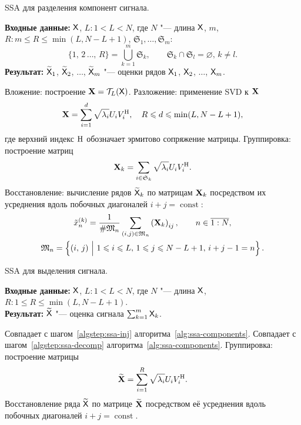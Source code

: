 \documentclass[specialist,
  substylefile=spbu_report.rtx,
subf,href,colorlinks=true, 12pt]{disser}
\theoremstyle{plain}
\theoremstyle{definition}
\theoremstyle{remark}
\newcommand{\Input}{\textbf{Входные данные: }}
\newcommand{\Output}{\textbf{Результат: }}
\begin{document}
\begin{algorithm}[!ht]
  \caption{SSA для разделения компонент сигнала.}
  \label{alg:ssa-components}
  \Input $\mathsf{X}$, $L: 1 < L < N$, где $N$ "--- длина $\mathsf{X}$, $m$, $R: m
  \leqslant R\leqslant \min(L, N-L+1)$,
  $\mathfrak{S}_1, \ldots, \mathfrak{S}_m$:
  \[
    \{1,\, 2\,\ldots,\, R\}=\bigcup_{k=1}^{m}\mathfrak{S}_k, \qquad
    \mathfrak{S}_k\cap \mathfrak{S}_l =\varnothing,\,
    k\ne l.
  \]
  \Output $\widetilde{\mathsf{X}}_1$, $\widetilde{\mathsf{X}}_2$, $\ldots$,
  $\widetilde{\mathsf{X}}_m$ "--- оценки рядов
  $\mathsf{X}_1$, $\mathsf{X}_2$, $\ldots$, $\mathsf{X}_m$.
  \begin{algorithmic}[1]
    \State Вложение: построение $\mathbf{X}=\mathcal{T}_L(\mathsf{X})$. \label{algstep:ssa-inj}
    \State Разложение: применение SVD к $\mathbf{X}$ \label{algstep:ssa-decomp}
    \begin{equation*}
      \mathbf{X}=\sum_{i=1}^{d} \sqrt{\lambda_i} U_i V_i^{\mathrm{H}}, \quad R
      \leqslant d \leqslant \min(L, N-L+1),
    \end{equation*}
    где верхний индекс $\mathrm{H}$ обозначает эрмитово сопряжение матрицы.
    \State Группировка: построение матриц
    \begin{equation*}
      \mathbf{X}_k=\sum_{i \in \mathfrak{S}_k} \sqrt{\lambda_i} U_i V_i^{\mathrm{H}}.
    \end{equation*}
    \State Восстановление: вычисление рядов $\widetilde{\mathsf{X}}_k$ по
    матрицам $\mathbf{X}_k$ посредством их усреднения
    вдоль побочных диагоналей $i + j =\operatorname{const}$:
    \begin{gather*}
      \tilde{x}^{(k)}_n=\frac{1}{\#\mathfrak{M}_n}\sum_{(i,j)\in \mathfrak{M}_n}
      \left(\mathbf{X}_k\right)_{ij},\qquad n\in \overline{1:N},\\
      \mathfrak{M}_n=\left\{(i,\, j)~\Big|~1\leqslant i \leqslant
        L,\, 1\leqslant j \leqslant N-L+1,\,
      i+j-1=n\right\}.
    \end{gather*}
  \end{algorithmic}
\end{algorithm}

\begin{algorithm}[!ht]
  \caption{SSA для выделения сигнала.}
  \label{alg:ssa-signal}
  \Input $\mathsf{X}$, $L: 1 < L < N$, где $N$ "--- длина $\mathsf{X}$, $R: 1
  \leqslant R\leqslant \min(L, N-L+1)$.\\
  \Output $\widetilde{\mathsf{X}}$ "--- оценка сигнала $\sum_{k=1}^{m} \mathsf{X}_k$.
  \begin{algorithmic}[1]
    \State Совпадает с шагом~\ref{algstep:ssa-inj}
    алгоритма~\ref{alg:ssa-components}.
    \State Совпадает с шагом~\ref{algstep:ssa-decomp}
    алгоритма~\ref{alg:ssa-components}.
    \State Группировка: построение матрицы
    \begin{equation*}
      \widetilde{\mathbf{X}} = \sum_{i = 1}^{R} \sqrt{\lambda_i} U_i V_i^{\mathrm{H}}.
    \end{equation*}
    \State Восстановление ряда $\widetilde{\mathsf{X}}$ по матрице
    $\widetilde{\mathbf{X}}$ посредством её усреднения
    вдоль побочных диагоналей $i + j =\operatorname{const}$.
  \end{algorithmic}
\end{algorithm}
\end{document}
